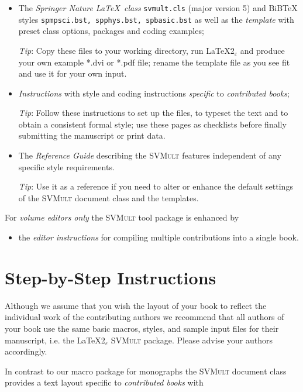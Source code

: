 \documentclass[graybox]{svmult}
\begin{document}
\begin{refguide}
\begin{itemize}
\item The \emph{Springer Nature \LaTeX~class} \texttt{svmult.cls} (major version 5) and BiBTeX styles \texttt{spmpsci.bst, spphys.bst, spbasic.bst} as well as the \emph{template} with preset class options, packages and coding examples;

\emph{Tip}: Copy these files to your working directory, run \LaTeX2$_\varepsilon$ and produce your own example *.dvi or *.pdf file; rename the template file as you see fit and use it for your own input.

\item \emph{Instructions} with style and coding instructions \emph{specific} to \emph{contributed books};

\emph{Tip}: Follow these instructions to set up the files, to typeset the text and to obtain a consistent formal style; use these pages as checklists before finally submitting the manuscript or print data.

\item The \emph{Reference Guide} describing the \textsc{SVMult} features independent of any specific style requirements.

\emph{Tip}: Use it as a reference if you need to alter or enhance the default
settings of the \textsc{SVMult} document class and the templates.
\end{itemize}
For \emph{volume editors only} the \textsc{SVMult} tool package is enhanced by

\begin{itemize}
\item the \emph{editor instructions} for compiling multiple contributions into a single book.
\end{itemize}

\section{ Step-by-Step Instructions}

Although we assume that you wish the layout of your book to reflect the individual work of the contributing authors we recommend that all authors of your book use the same basic macros, styles, and sample input files for their manuscript, i.e. the \LaTeX2$_\varepsilon$ \textsc{SVMult} package. Please advise your authors accordingly.

\noindent
In contrast to our macro package for monographs the \textsc{SVMult} document class provides a text layout specific to \emph{contributed books} with



\end{refguide}
\end{document}
